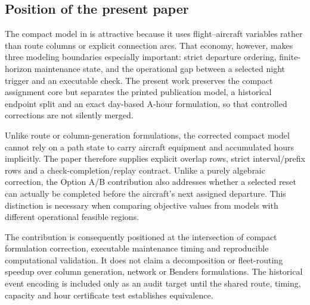 \subsection{Position of the present paper}

The compact model in \citet{khaled2018compact} is attractive because it uses
flight--aircraft variables rather than route columns or explicit connection
arcs. That economy, however, makes three modeling boundaries especially
important: strict departure ordering, finite-horizon maintenance state, and
the operational gap between a selected night trigger and an executable check.
The present work preserves the compact assignment core but separates the
printed publication model, a historical endpoint split and an exact day-based
A-hour formulation, so that controlled corrections are not silently merged.

Unlike route or column-generation formulations, the corrected compact model
cannot rely on a path state to carry aircraft equipment and accumulated hours
implicitly. The paper therefore supplies explicit overlap rows, strict
interval/prefix rows and a check-completion/replay contract. Unlike a purely
algebraic correction, the Option A/B contribution also addresses whether a
selected reset can actually be completed before the aircraft's next assigned
departure. This distinction is necessary when comparing objective values from
models with different operational feasible regions.

The contribution is consequently positioned at the intersection of compact
formulation correction, executable maintenance timing and reproducible
computational validation. It does not claim a decomposition or fleet-routing
speedup over column generation, network or Benders formulations. The
historical event encoding is included only as an audit target until the shared
route, timing, capacity and hour certificate test establishes equivalence.
